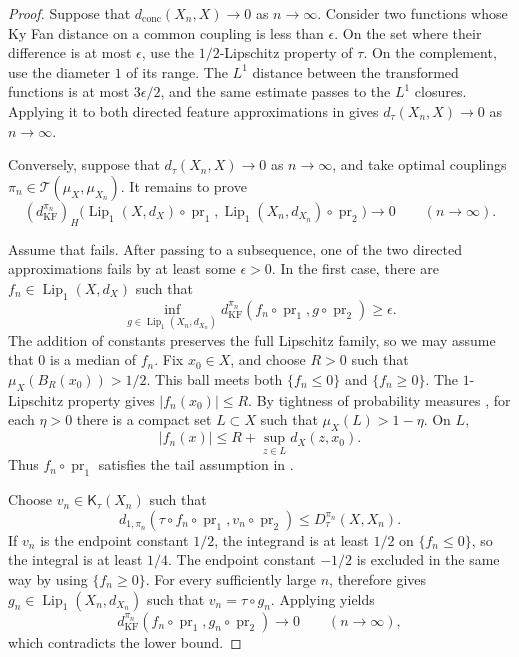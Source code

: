\documentclass[11pt]{amsart}
\theoremstyle{plain}
\theoremstyle{definition}
\theoremstyle{remark}
\newcommand{\T}{\mathcal T}
\newcommand{\Kc}{\mathsf K}
\newcommand{\dconc}{d_{\mathrm{conc}}}
\newcommand{\dtau}{d_{\tau}}
\newcommand{\kf}{d_{\operatorname{KF}}}
\DeclareMathOperator{\pr}{pr}
\begin{document}
\begin{proof}
Suppose that $\dconc(X_n,X)\to0$ as $n\to\infty$. Consider two functions whose Ky Fan distance on a common coupling is less than $\epsilon$. On the set where their difference is at most $\epsilon$, use the $1/2$-Lipschitz property of $\tau$. On the complement, use the diameter $1$ of its range. The $L^1$ distance between the transformed functions is at most $3\epsilon/2$, and the same estimate passes to the $L^1$ closures. Applying it to both directed feature approximations in  gives $\dtau(X_n,X)\to0$ as $n\to\infty$.

Conversely, suppose that $\dtau(X_n,X)\to0$ as $n\to\infty$, and take optimal couplings $\pi_n\in\T(\mu_X,\mu_{X_n})$. It remains to prove
\begin{equation}
\label{eq:mm-kyfan}
(\kf^{\pi_n})_H\bigl(
\operatorname{Lip}_1(X,d_X)\circ\pr_1,
\operatorname{Lip}_1(X_n,d_{X_n})\circ\pr_2
\bigr)\longrightarrow0
\qquad(n\to\infty).
\end{equation}

Assume that  fails. After passing to a subsequence, one of the two directed approximations fails by at least some $\epsilon>0$. In the first case, there are $f_n\in\operatorname{Lip}_1(X,d_X)$ such that
\[
\inf_{g\in\operatorname{Lip}_1(X_n,d_{X_n})}
\kf^{\pi_n}(f_n\circ\pr_1,g\circ\pr_2)\geq\epsilon.
\]
The addition of constants preserves the full Lipschitz family, so we may assume that $0$ is a median of $f_n$. Fix $x_0\in X$, and choose $R>0$ such that $\mu_X(B_R(x_0))>1/2$. This ball meets both $\{f_n\leq0\}$ and $\{f_n\geq0\}$. The $1$-Lipschitz property gives $|f_n(x_0)|\leq R$. By tightness of probability measures \cite[Definition~1.18 and Theorem~1.19]{shioya2016mmg}, for each $\eta>0$ there is a compact set $L\subset X$ such that $\mu_X(L)>1-\eta$. On $L$,
\[
|f_n(x)|\leq R+\sup_{z\in L}d_X(z,x_0).
\]
Thus $f_n\circ\pr_1$ satisfies the tail assumption in .

Choose $v_n\in\Kc_\tau(X_n)$ such that
\[
d_{1,\pi_n}(\tau\circ f_n\circ\pr_1,v_n\circ\pr_2)
\leq D_\tau^{\pi_n}(X,X_n).
\]
If $v_n$ is the endpoint constant $1/2$, the integrand is at least $1/2$ on $\{f_n\leq0\}$, so the integral is at least $1/4$. The endpoint constant $-1/2$ is excluded in the same way by using $\{f_n\geq0\}$. For every sufficiently large $n$,  therefore gives $g_n\in\operatorname{Lip}_1(X_n,d_{X_n})$ such that $v_n=\tau\circ g_n$. Applying  yields
\[
\kf^{\pi_n}(f_n\circ\pr_1,g_n\circ\pr_2)\longrightarrow0
\qquad(n\to\infty),
\]
which contradicts the lower bound.


\end{proof}
\end{document}
